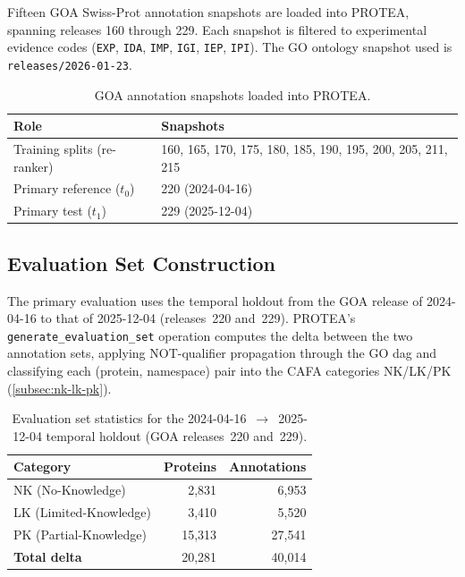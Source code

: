 Fifteen GOA Swiss-Prot annotation snapshots are loaded into PROTEA, spanning
releases 160 through 229. Each snapshot is filtered to experimental evidence
codes (\texttt{EXP}, \texttt{IDA}, \texttt{IMP}, \texttt{IGI}, \texttt{IEP},
\texttt{IPI}). The GO ontology snapshot used is \texttt{releases/2026-01-23}.

\begin{table}[htbp]
  \centering
  \caption{GOA annotation snapshots loaded into PROTEA.}
  \label{tab:goa-snapshots}
  \begin{tabular}{lp{9cm}}
    \toprule
    \textbf{Role} & \textbf{Snapshots} \\
    \midrule
    Training splits (re-ranker) & 160, 165, 170, 175, 180, 185, 190, 195, 200, 205, 211, 215 \\
    Primary reference ($t_0$) & 220 (2024-04-16) \\
    Primary test ($t_1$) & 229 (2025-12-04) \\
    \bottomrule
  \end{tabular}
\end{table}

\subsection{Evaluation Set Construction}

The primary evaluation uses the temporal holdout from the GOA release of
2024-04-16 to that of 2025-12-04 (releases~220 and~229). PROTEA's
\texttt{generate\_evaluation\_set} operation computes the delta between the two
annotation sets, applying NOT-qualifier propagation through the GO \gls{dag}
and classifying each (protein, namespace) pair into the CAFA categories
NK/LK/PK (\cref{subsec:nk-lk-pk}).

\begin{table}[htbp]
  \centering
  \caption{Evaluation set statistics for the 2024-04-16~$\to$~2025-12-04
  temporal holdout (GOA releases~220 and~229).}
  \label{tab:eval-set-stats}
  \begin{tabular}{lrr}
    \toprule
    \textbf{Category} & \textbf{Proteins} & \textbf{Annotations} \\
    \midrule
    NK (No-Knowledge)      & 2,831  & 6,953  \\
    LK (Limited-Knowledge) & 3,410  & 5,520  \\
    PK (Partial-Knowledge) & 15,313 & 27,541 \\
    \midrule
    \textbf{Total delta}   & 20,281 & 40,014 \\
    \bottomrule
  \end{tabular}
\end{table}

